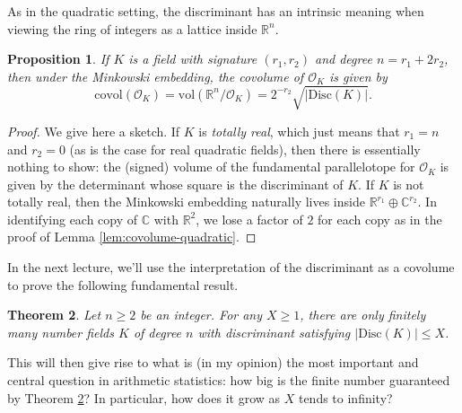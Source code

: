 \documentclass[12pt]{amsart}
\newtheorem{theorem}{Theorem}
\newtheorem{proposition}[theorem]{Proposition}
\theoremstyle{definition} \newtheorem*{notation}{Notation}
\theoremstyle{remark} \newtheorem*{remark}{Remark}
\theoremstyle{remark} \newtheorem*{example}{Example}
\theoremstyle{definition} \newtheorem*{definition}{Definition}
\numberwithin{equation}{section}
\numberwithin{theorem}{section}
\begin{document}
	As in the quadratic setting, the discriminant has an intrinsic meaning when viewing the ring of integers as a lattice inside $\mathbb{R}^n$.
	
	\begin{proposition}\label{prop:covolume}
		If $K$ is a field with signature $(r_1,r_2)$ and degree $n=r_1+2r_2$, then under the Minkowski embedding, the covolume of $\mathcal{O}_K$ is given by 
			\[
				\mathrm{covol}(\mathcal{O}_K) = \mathrm{vol}(\mathbb{R}^n/\mathcal{O}_K) = 2^{-r_2} \sqrt{|\mathrm{Disc}(K)|}.
			\]
	\end{proposition}
	\begin{proof}
		We give here a sketch.  If $K$ is \emph{totally real}, which just means that $r_1 = n$ and $r_2=0$ (as is the case for real quadratic fields), then there is essentially nothing to show: the (signed) volume of the fundamental parallelotope for $\mathcal{O}_K$ is given by the determinant whose square is the discriminant of $K$.  If $K$ is not totally real, then the Minkowski embedding naturally lives inside $\mathbb{R}^{r_1} \oplus \mathbb{C}^{r_2}$.  In identifying each copy of $\mathbb{C}$ with $\mathbb{R}^2$, we lose a factor of $2$ for each copy as in the proof of Lemma \ref{lem:covolume-quadratic}.
	\end{proof}

	In the next lecture, we'll use the interpretation of the discriminant as a covolume to prove the following fundamental result.
	
	\begin{theorem}\label{thm:hermite-minkowski}
		Let $n \geq 2$ be an integer.  For any $X \geq 1$, there are only finitely many number fields $K$ of degree $n$ with discriminant satisfying $|\mathrm{Disc}(K)| \leq X$.
	\end{theorem}
	
	This will then give rise to what is (in my opinion) the most important and central question in arithmetic statistics: how big is the finite number guaranteed by Theorem \ref{thm:hermite-minkowski}?  In particular, how does it grow as $X$ tends to infinity?
\end{document}
